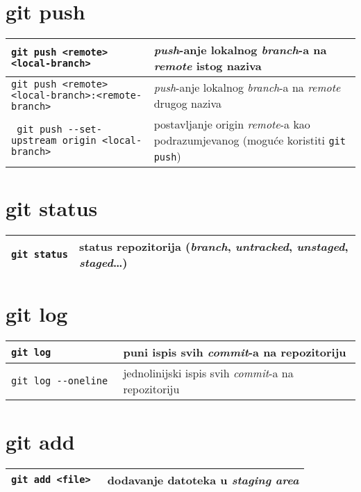 \documentclass[10pt]{article}
\begin{document}
    \section*{git push}
    \begin{tabular}{|>{\tt}p{9.00cm}|>{}p{15.50cm}|}
        \hline
        git push <remote> <local-branch>                    & \textit{push}-anje lokalnog \textit{branch}-a na \textit{remote} istog naziva \\ \hline
        git push <remote> <local-branch>:<remote-branch>    & \textit{push}-anje lokalnog \textit{branch}-a na \textit{remote} drugog naziva \\ \hline
        git push -{}-set-upstream origin <local-branch>       & postavljanje origin \textit{remote}-a kao podrazumjevanog (moguće koristiti \texttt{git push}) \\ \hline                   
    \end{tabular}

    \section*{git status}
    \begin{tabular}{|>{\tt}p{9.00cm}|>{}p{15.50cm}|}
        \hline
        git status                                          & status repozitorija (\textit{branch}, \textit{untracked}, \textit{unstaged}, \textit{staged}\dots) \\ \hline
    \end{tabular}

    \section*{git log}
    \begin{tabular}{|>{\tt}p{9.00cm}|>{}p{15.50cm}|}
        \hline
        git log                                             & puni ispis svih \textit{commit}-a na repozitoriju \\ \hline 
        git log -{}-oneline                                   & jednolinijski ispis svih \textit{commit}-a na repozitoriju \\ \hline
    \end{tabular}

    \section*{git add}
    \begin{tabular}{|>{\tt}p{9.00cm}|>{}p{15.50cm}|}
        \hline
        git add <file>                                      & dodavanje datoteka u \textit{staging area} \\ \hline
    \end{tabular}
\end{document}
